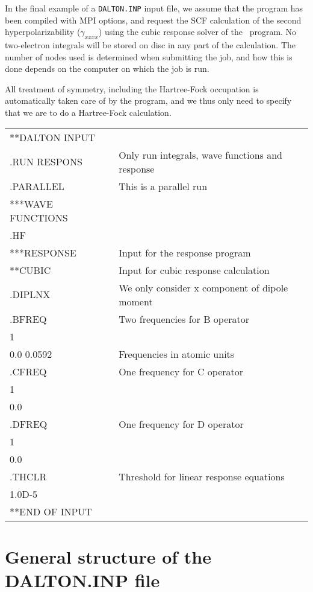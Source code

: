 In the final example of a \verb|DALTON.INP| input file, we assume that
the program has been compiled with MPI options, and request the SCF
calculation of the second hyperpolarizability  ($\gamma_{xxxx}$) using 
the cubic response solver of the \resp\
program. No two-electron 
integrals will be stored on disc in any part of the calculation. The
number of nodes\index{node} used is determined when submitting the
job, and how 
this is done depends on the computer on which the job is run.

All treatment  of symmetry, including the Hartree-Fock
occupation is
automatically taken care of by the program, and we thus only need to
specify that we are to do a Hartree-Fock calculation.

{\ttfamily
\begin{tabular}{ll}
**DALTON INPUT\\
.RUN RESPONS\hspace{4cm} & Only run integrals, wave functions and
response\\
.PARALLEL & This is a parallel run\\
***WAVE FUNCTIONS\\
.HF\\
***RESPONSE & Input for the response program\\
**CUBIC & Input for cubic response calculation\\
.DIPLNX & We only consider x component of dipole moment\\
.BFREQ & Two frequencies for B operator\\
 1\\
 0.0 0.0592& Frequencies in atomic units\\
.CFREQ & One frequency for C operator\\
 1\\
 0.0\\
.DFREQ & One frequency for D operator\\
 1\\
 0.0\\
.THCLR & Threshold for linear response equations\\
 1.0D-5\\
**END OF INPUT\\
\end{tabular}}

\section{General structure of the DALTON.INP file}\label{sec:inputstructure}

